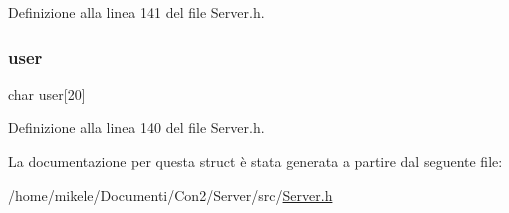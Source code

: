 Definizione alla linea 141 del file Server.\+h.

\mbox{\label{a00072_a5d3c37c25271af8d09ce76fb32508f26}} 
\subsubsection{\texorpdfstring{user}{user}}
{\footnotesize\ttfamily char user\mbox{[}20\mbox{]}}



Definizione alla linea 140 del file Server.\+h.



La documentazione per questa struct è stata generata a partire dal seguente file\+:\begin{DoxyCompactItemize}
\item 
/home/mikele/\+Documenti/\+Con2/\+Server/src/\mbox{\hyperlink{a00050}{Server.\+h}}\end{DoxyCompactItemize}
